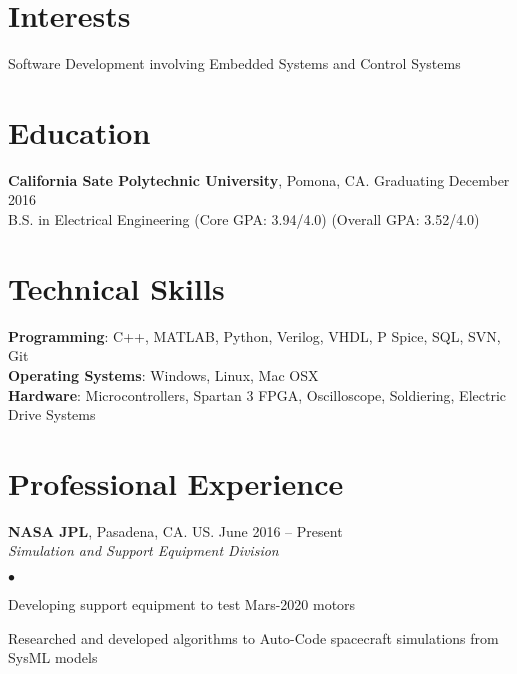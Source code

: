\documentclass[margin,line]{res}
\newenvironment{list2}{
  \begin{list}{$\bullet$}{%
      \setlength{\itemsep}{0in}
      \setlength{\parsep}{0in} \setlength{\parskip}{0in}
      \setlength{\topsep}{0in} \setlength{\partopsep}{0in}
      \setlength{\leftmargin}{0.2in}}}{\end{list}}
\begin{document}

\begin{resume}

\section{\sc Interests}
Software Development involving Embedded Systems and Control Systems

\section{\sc Education}
{\bf California Sate Polytechnic University}, Pomona, CA.  \hfill Graduating December 2016\\
B.S. in Electrical Engineering \hfill(Core GPA: 3.94/4.0) (Overall GPA: 3.52/4.0)

\section{\sc Technical Skills}
{\bf Programming}:  C++, MATLAB, Python, Verilog, VHDL, P Spice, SQL, SVN, Git\\
{\bf Operating Systems}: Windows, Linux, Mac OSX\\
{\bf Hardware}: Microcontrollers, Spartan 3 FPGA, Oscilloscope, Soldiering, Electric Drive Systems


\section{\sc Professional Experience}
{\bf NASA JPL}, Pasadena, CA. US. \hfill{June 2016 -- Present}\\
{\em Simulation and Support Equipment Division}\hfill 
\begin{list2} %
\item Developing support equipment to test Mars-2020 motors
\item Researched and developed algorithms to Auto-Code spacecraft simulations from SysML models
\end{list2}



\end{resume}
\end{document}
